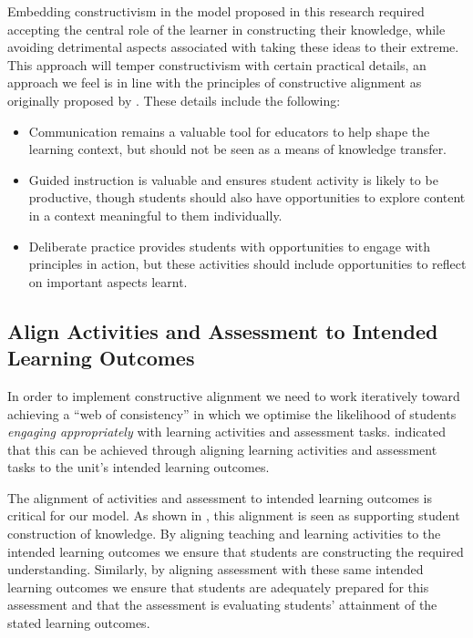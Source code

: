 %
%
% 
%

Embedding constructivism in the model proposed in this research required accepting the central role of the learner in constructing their knowledge, while avoiding detrimental aspects associated with taking these ideas to their extreme. This approach will temper constructivism with certain practical details, an approach we feel is in line with the principles of constructive alignment as originally proposed by \citet{Biggs:1996c}. These details include the following:

\begin{itemize}[noitemsep,nolistsep]
	\item Communication remains a valuable tool for educators to help shape the learning context, but should not be seen as a means of knowledge transfer.
	\item Guided instruction is valuable and ensures student activity is likely to be productive, though students should also have opportunities to explore content in a context meaningful to them individually.
	\item Deliberate practice provides students with opportunities to engage with principles in action, but these activities should include opportunities to reflect on important aspects learnt.
\end{itemize}


\subsection{Align Activities and Assessment to Intended Learning Outcomes} %
\label{ssub:align_activities_and_assessment_to_intended_learning_outcomes_}

In order to implement constructive alignment we need to work iteratively toward achieving a ``web of consistency'' \cite{Biggs:1999} in which we optimise the likelihood of students \emph{engaging appropriately} with learning activities and assessment tasks. \citet{Biggs:1996c} indicated that this can be achieved through aligning learning activities and assessment tasks to the unit's intended learning outcomes. 

The alignment of activities and assessment to intended learning outcomes is critical for our model. As shown in , this alignment is seen as supporting student construction of knowledge. By aligning teaching and learning activities to the intended learning outcomes we ensure that students are constructing the required understanding. Similarly, by aligning assessment with these same intended learning outcomes we ensure that students are adequately prepared for this assessment and that the assessment is evaluating students' attainment of the stated learning outcomes. 

